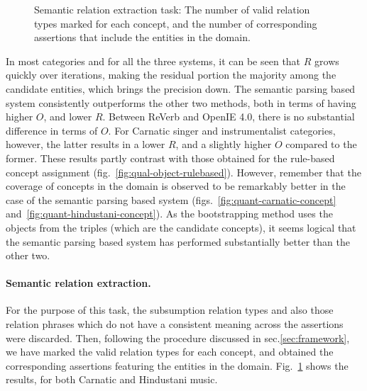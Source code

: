 \documentclass{llncs}
\begin{document}
{\begin{figure}[!t]
\begin{center}
{		 \label{fig:qual-semantic-relex-hindustani}
        }%
        \qquad
\end{center}
\caption{Semantic relation extraction task: The number of valid relation types marked for each concept, and the number of corresponding assertions that include the entities in the domain.}
\label{fig:qual-semantic-relex}
\end{figure}
}

In most categories and for all the three systems, it can be seen that $R$ grows quickly over iterations, making the residual portion the majority among the candidate entities, which brings the precision down. The semantic parsing based system consistently outperforms the other two methods, both in terms of having higher $O$, and lower $R$. Between ReVerb and OpenIE 4.0, there is no substantial difference in terms of $O$. For Carnatic singer and instrumentalist categories, however, the latter results in a lower $R$, and a slightly higher $O$ compared to the former. These results partly contrast with those obtained for the rule-based concept assignment (fig.~\ref{fig:qual-object-rulebased}). However, remember that the coverage of concepts in the domain is observed to be remarkably better in the case of the semantic parsing based system 
(figs.~\ref{fig:quant-carnatic-concept} and~\ref{fig:quant-hindustani-concept}). As the bootstrapping method uses the objects from the triples (which are the candidate concepts), it seems logical that the semantic parsing based system has performed substantially better than the other two.

\paragraph{Semantic relation extraction.}
For the purpose of this task, the subsumption relation types and also those relation phrases which do not have a consistent meaning across the assertions were discarded. Then, following the procedure discussed in sec.\ref{sec:framework}, we have marked the valid relation types for each concept, and obtained the corresponding assertions featuring the entities in the domain. Fig.~\ref{fig:qual-semantic-relex} shows the results, for both Carnatic and Hindustani music. 
\end{document}
